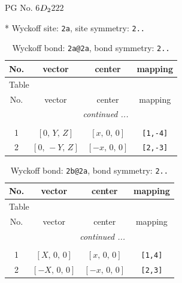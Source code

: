 \documentclass[fleqn,8pt]{jsarticle}
\begin{document}
\setcounter{MaxMatrixCols}{32}

\renewcommand{\tablename}{Table~}
\renewcommand{\figurename}{Figure~}
\begin{center}
\LARGE
PG No. 6\quad$D_{\rm 2}$\quad$222$\quad[ orthorhombic ]
\end{center}


* Wyckoff site: {\tt 2a}, site symmetry: {\tt 2..}
\renewcommand{\arraystretch}{1.2}
\begin{longtable}{cccc}
\caption{Wyckoff bond: {\tt 2a@2a}, bond symmetry: {\tt 2..}}
 \\
 \hline \hline
No. & vector & center & mapping \\ \hline \endfirsthead

\multicolumn{3}{l}{\tablename\ \thetable{}} \\
 \hline \hline
No. & vector & center & mapping \\ \hline \endhead

 \hline \hline
\multicolumn{3}{r}{\footnotesize\it continued ...} \\ \endfoot

 \hline \hline
\multicolumn{3}{r}{} \\ \endlastfoot

1 & $\left[ 0,\, Y,\, Z \right]$ & $\left[ x,\, 0,\, 0 \right]$ & {\tt [1,-4]} \\ \hline
2 & $\left[ 0,\, - Y,\, Z \right]$ & $\left[ - x,\, 0,\, 0 \right]$ & {\tt [2,-3]} \\
\end{longtable}
\renewcommand{\arraystretch}{1.2}
\begin{longtable}{cccc}
\caption{Wyckoff bond: {\tt 2b@2a}, bond symmetry: {\tt 2..}}
 \\
 \hline \hline
No. & vector & center & mapping \\ \hline \endfirsthead

\multicolumn{3}{l}{\tablename\ \thetable{}} \\
 \hline \hline
No. & vector & center & mapping \\ \hline \endhead

 \hline \hline
\multicolumn{3}{r}{\footnotesize\it continued ...} \\ \endfoot

 \hline \hline
\multicolumn{3}{r}{} \\ \endlastfoot

1 & $\left[ X,\, 0,\, 0 \right]$ & $\left[ x,\, 0,\, 0 \right]$ & {\tt [1,4]} \\ \hline
2 & $\left[ - X,\, 0,\, 0 \right]$ & $\left[ - x,\, 0,\, 0 \right]$ & {\tt [2,3]} \\
\end{longtable}
\end{document}
